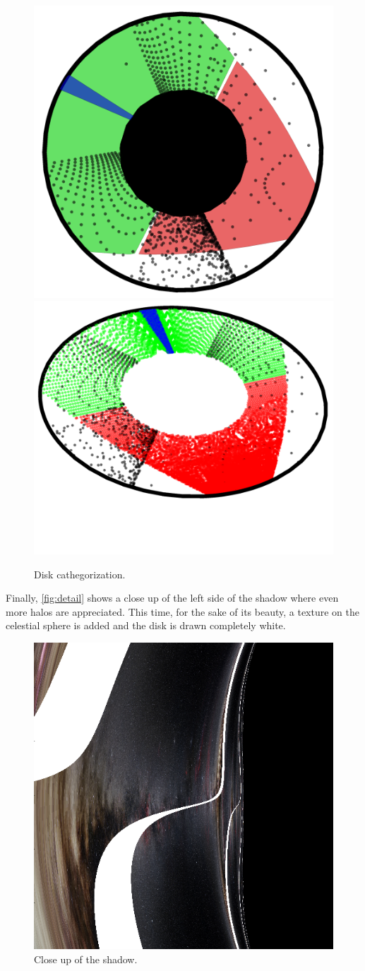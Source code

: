 \begin{figure}[bth]
	\myfloatalign
	{\includegraphics[width=.35\linewidth]{gfx/disk_cathegorization}} \quad
	{\includegraphics[width=.35\linewidth]{gfx/disk_cathegorization2}}
	\caption[Disk cathegorization]{Disk cathegorization.}
	\label{fig:cathegories}
\end{figure}

Finally, \autoref{fig:detail} shows a close up of the left side of the shadow where even more halos are appreciated. This time, for the sake of its beauty, a texture on the celestial sphere is added and the disk is drawn completely white.

\begin{figure}[bth]
	\myfloatalign
	\includegraphics[width=.6\linewidth]{gfx/bh_detail_texture_disk-white}
	\caption[Close up of the shadow]{Close up of the shadow.}
	\label{fig:detail}
\end{figure}

